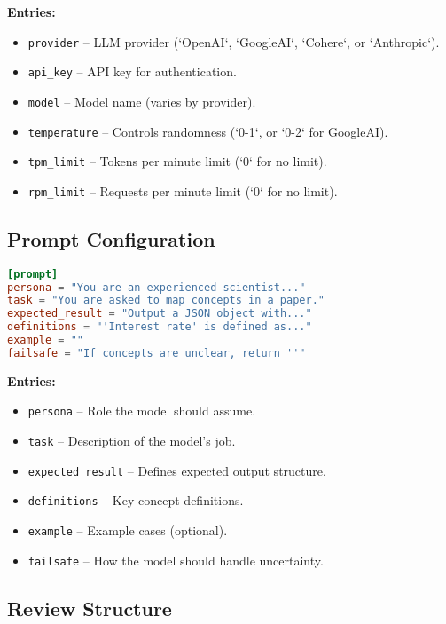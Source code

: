 \textbf{Entries:}
\begin{itemize}
    \item \texttt{provider} – LLM provider (`OpenAI`, `GoogleAI`, `Cohere`, or `Anthropic`).
    \item \texttt{api\_key} – API key for authentication.
    \item \texttt{model} – Model name (varies by provider).
    \item \texttt{temperature} – Controls randomness (`0-1`, or `0-2` for GoogleAI).
    \item \texttt{tpm\_limit} – Tokens per minute limit (`0` for no limit).
    \item \texttt{rpm\_limit} – Requests per minute limit (`0` for no limit).
\end{itemize}

\subsection{Prompt Configuration}

\begin{configbox}
\begin{lstlisting}[language=TOML]
[prompt]
persona = "You are an experienced scientist..."
task = "You are asked to map concepts in a paper."
expected_result = "Output a JSON object with..."
definitions = "'Interest rate' is defined as..."
example = ""
failsafe = "If concepts are unclear, return ''"
\end{lstlisting}
\end{configbox}

\textbf{Entries:}
\begin{itemize}
    \item \texttt{persona} – Role the model should assume.
    \item \texttt{task} – Description of the model’s job.
    \item \texttt{expected\_result} – Defines expected output structure.
    \item \texttt{definitions} – Key concept definitions.
    \item \texttt{example} – Example cases (optional).
    \item \texttt{failsafe} – How the model should handle uncertainty.
\end{itemize}

\subsection{Review Structure}

